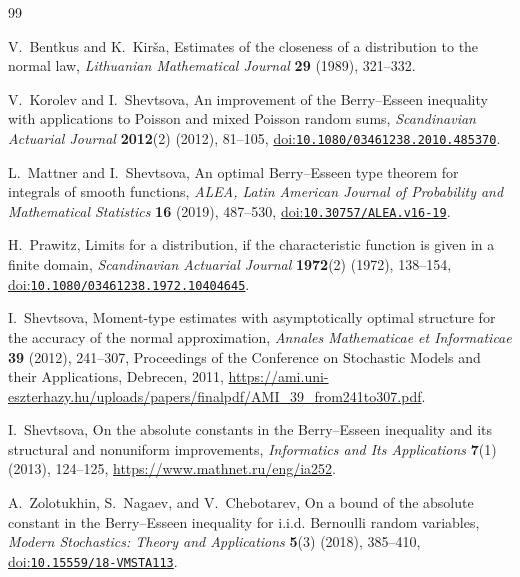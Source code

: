 \documentclass[11pt,a4paper,twoside]{article}
\theoremstyle{remark}
\newcommand{\doi}[1]{\href{https://doi.org/#1}{doi:\nolinkurl{#1}}}
\begin{document}
\begin{thebibliography}{99}
\raggedright

V.~Bentkus and K.~Kir\v{s}a,
\newblock Estimates of the closeness of a distribution to the normal law,
\newblock \emph{Lithuanian Mathematical Journal} \textbf{29} (1989),
321--332.

V.~Korolev and I.~Shevtsova,
\newblock An improvement of the Berry--Esseen inequality with applications
to Poisson and mixed Poisson random sums,
\newblock \emph{Scandinavian Actuarial Journal} \textbf{2012}(2) (2012),
81--105,
\newblock \doi{10.1080/03461238.2010.485370}.

L.~Mattner and I.~Shevtsova,
\newblock An optimal Berry--Esseen type theorem for integrals of smooth
functions,
\newblock \emph{ALEA, Latin American Journal of Probability and Mathematical
Statistics} \textbf{16} (2019), 487--530,
\newblock \doi{10.30757/ALEA.v16-19}.

H.~Prawitz,
\newblock Limits for a distribution, if the characteristic function is
given in a finite domain,
\newblock \emph{Scandinavian Actuarial Journal} \textbf{1972}(2) (1972),
138--154,
\newblock \doi{10.1080/03461238.1972.10404645}.

I.~Shevtsova,
\newblock Moment-type estimates with asymptotically optimal structure for
the accuracy of the normal approximation,
\newblock \emph{Annales Mathematicae et Informaticae} \textbf{39} (2012),
241--307,
\newblock Proceedings of the Conference on Stochastic Models and their
Applications, Debrecen, 2011,
\newblock \url{https://ami.uni-eszterhazy.hu/uploads/papers/finalpdf/AMI_39_from241to307.pdf}.

I.~Shevtsova,
\newblock On the absolute constants in the Berry--Esseen inequality and its
structural and nonuniform improvements,
\newblock \emph{Informatics and Its Applications} \textbf{7}(1) (2013),
124--125,
\newblock \url{https://www.mathnet.ru/eng/ia252}.

A.~Zolotukhin, S.~Nagaev, and V.~Chebotarev,
\newblock On a bound of the absolute constant in the Berry--Esseen inequality
for i.i.d. Bernoulli random variables,
\newblock \emph{Modern Stochastics: Theory and Applications} \textbf{5}(3)
(2018), 385--410,
\newblock \doi{10.15559/18-VMSTA113}.

\end{thebibliography}
\end{document}
